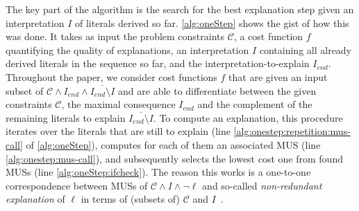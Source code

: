 \documentclass[a4paper,UKenglish,cleveref, autoref, thm-restate, pdfa]{lipics-v2021}
\newcommand\m[1]{\mathcal{#1}}
\renewcommand\comment[1]{}
\newcommand{\emilio}[1]{{\comment{\color{red}Emilio: #1}}}
\newcommand{\bart}[1]{{\comment{\color{OliveGreen}Bart: #1}}}
\newcommand\Iend{\ensuremath{I_\mathit{end} }\xspace}
\newcommand\formulac{\ensuremath{\m{C} }\xspace}
\begin{document}
	
	
	The key part of the algorithm is the search for the best explanation step given an interpretation $I$ of literals derived so far. 
	\cref{alg:oneStep} shows the gist of how this was done. 
	It takes as input the problem constraints \formulac, a cost function $f$ quantifying the quality of explanations, an interpretation $I$ containing all already derived literals in the sequence so far, and the interpretation-to-explain $\Iend$. 
	\emilio{Check the following with modification to the cost function so that it fits the journal paper more:} Throughout the paper, we consider cost functions $f$ that are given an input subset of $\formulac \wedge \Iend \wedge \overline{\Iend \setminus I}$ and are able to differentiate between the given constraints $\formulac$, the maximal consequence $ \Iend$ and the complement of the remaining literals to explain $\overline{\Iend \setminus I}$. 
	\emilio{Otherwhise, just from the algorithms, I have the impression it's not possible to recreate a whole explanation sequence with re-reading AIJ paper. The propagation step is not obvious.}
	To compute an explanation, this procedure iterates over the literals that are still to explain (line \ref{alg:onestep:repetition:mus-call} of \cref{alg:oneStep}), computes for each of them an associated MUS (line \ref{alg:onestep:mus-call}), and subsequently selects the lowest cost one from found MUSs (line \ref{alg:oneStep:ifcheck}).
	The reason this works is a one-to-one correspondence between MUSs of $\formulac \land I \land \neg \ell$ and so-called \emph{non-redundant explanation} of $\ell$ in terms of (subsets of) $\formulac$ and $I$~\cite{ecai/BogaertsGCG20}. 
	
\end{document}
